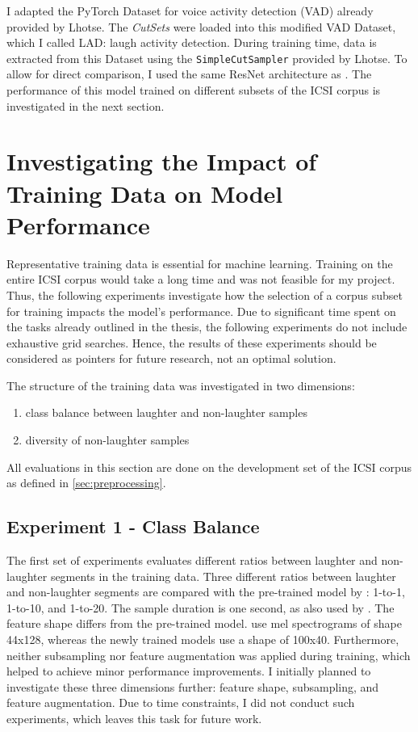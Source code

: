\documentclass[bsc,frontabs,parskip,deptreport]{infthesis}
\begin{document}
I adapted the PyTorch Dataset for voice activity detection (VAD) already provided by Lhotse.
The \textit{CutSets} were loaded into this modified VAD Dataset, which I called LAD: laugh activity detection.
During training time, data is extracted from this Dataset using the \texttt{SimpleCutSampler} provided by Lhotse. 
To allow for direct comparison, I used the same ResNet architecture as \citet{gillick2021robust}.
The performance of this model trained on different subsets of the ICSI corpus is investigated in the next section.

\chapter{Investigating the Impact of Training Data on Model Performance} \label{cha:experiments}
Representative training data is essential for machine learning. Training on the entire ICSI corpus would take a long time and was not feasible for my project.
Thus, the following experiments investigate how the selection of a corpus subset for training impacts the model's performance. 
Due to significant time spent on the tasks already outlined in the thesis, the following experiments do not include exhaustive grid searches. Hence, the results of these experiments should be considered as pointers for future research, not an optimal solution.

The structure of the training data was investigated in two dimensions: 
\begin{enumerate}
    \item class balance between laughter and non-laughter samples
    \item diversity of non-laughter samples 
\end{enumerate}

All evaluations in this section are done on the development set of the ICSI corpus as defined in \autoref{sec:preprocessing}.

\section{Experiment 1 - Class Balance} \label{sec:exp-1}
The first set of experiments evaluates different ratios between laughter and non-laughter segments in the training data.
Three different ratios between laughter and non-laughter segments are compared with the pre-trained model by \citet{gillick2021robust}: 1-to-1, 1-to-10, and 1-to-20.
The sample duration is one second, as also used by \citet{gillick2021robust}. The feature shape differs from the pre-trained model. \citet{gillick2021robust} use mel spectrograms of shape 44x128, whereas the newly trained models use a shape of 100x40.
Furthermore, neither subsampling nor feature augmentation was applied during training, which helped \citet{gillick2021robust} to achieve minor performance improvements.
I initially planned to investigate these three dimensions further: feature shape, subsampling, and feature augmentation. 
Due to time constraints, I did not conduct such experiments, which leaves this task for future work. 
\end{document}
